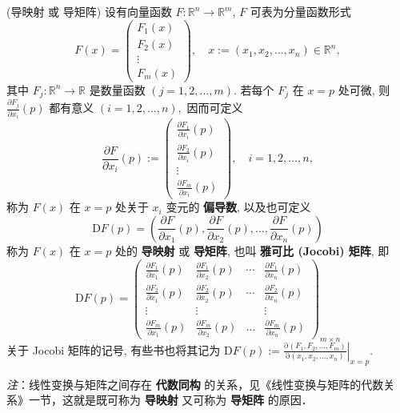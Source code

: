 \begin{definition}{(导映射 或 导矩阵)}
设有向量函数 $F:\mathbb{R}^{n}\rightarrow\mathbb{R}^{m}$, $F$ 可表为分量函数形式
$$
F(x)=\left(\begin{array}{c}
F_{1}(x)\\
F_{2}(x)\\
\vdots\\
F_{m}(x)
\end{array}\right),\quad x:=(x_{1},x_{2},\ldots,x_{n})\in\mathbb{R}^{n},
$$
其中 $F_{j}:\mathbb{R}^{n}\rightarrow\mathbb{R}$ 是数量函数 $(j=1,2,\ldots,m)$.
若每个 $F_{j}$ 在 $x=p$ 处可微, 则 ${\displaystyle \frac{\partial F_{j}}{\partial x_{i}}(p)}$
都有意义 $(i=1,2,\ldots,n),$ 因而可定义
$$
{\displaystyle \frac{\partial F}{\partial x_{i}}(p):=\left(\begin{array}{c}
\frac{\partial F_{1}}{\partial x_{i}}(p)\\
\frac{\partial F_{2}}{\partial x_{i}}(p)\\
\vdots\\
\frac{\partial F_{m}}{\partial x_{i}}(p)
\end{array}\right),\quad i=1,2,\ldots,n,}
$$
称为 $F(x)$ 在 $x=p$ 处关于 $x_{i}$ 变元的 \textbf{偏导数}, 以及也可定义
\[
\mathrm{D}F(p)=(\frac{\partial F}{\partial x_{1}}(p),\frac{\partial F}{\partial x_{2}}(p),\ldots,\frac{\partial F}{\partial x_{n}}(p))
\]
称为 $F(x)$ 在 $x=p$ 处的 \textbf{导映射} 或 \textbf{导矩阵}, 也叫 \textbf{雅可比 (Jocobi)
矩阵}, 即
$$
\mathrm{D}F(p)=\left(\begin{array}{cccc}
\frac{\partial F_{1}}{\partial x_{1}}(p) & \frac{\partial F_{1}}{\partial x_{2}}(p) & \cdots & \frac{\partial F_{1}}{\partial x_{n}}(p)\\
\frac{\partial F_{2}}{\partial x_{1}}(p) & \frac{\partial F_{2}}{\partial x_{2}}(p) & \cdots & \frac{\partial F_{2}}{\partial x_{n}}(p)\\
\vdots & \vdots &  & \vdots\\
\frac{\partial F_{m}}{\partial x_{1}}(p) & \frac{\partial F_{m}}{\partial x_{2}}(p) & \ldots & \frac{\partial F_{m}}{\partial x_{n}}(p)
\end{array}\right)_{m\times n}
$$
关于 Jocobi 矩阵的记号, 有些书也将其记为 $\mathrm{D}F(p):={\displaystyle \left.\frac{\mathrm{\partial}(F_{1},F_{2},\ldots,F_{m})}{\mathrm{\partial}(x_{1},x_{2},\ldots,x_{n})}\right|_{x=p}.}$
\end{definition}

\textsl{注}：线性变换与矩阵之间存在 \textbf{代数同构} 的关系，见《线性变换与矩阵的代数关系》一节，这就是既可称为 \textbf{导映射} 又可称为\textbf{ 导矩阵} 的原因． 


